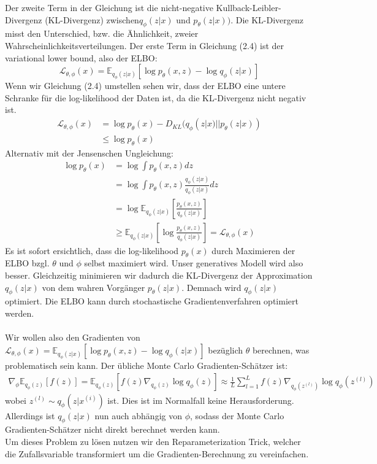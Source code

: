 \documentclass[%
thesis=student,%
coverpage=false,%
titlepage=false,%
headmarks=true, %
german,%
font=libertine, %
math=newpxtx, %
BCOR=5mm,%
coverBCOR=11mm%
]{tumbook}
\theoremstyle{break}
\begin{document}
Der zweite Term in der Gleichung ist die nicht-negative Kullback-Leibler-Divergenz (KL-Divergenz) zwischen$q_\phi(z|x)$ und $p_\theta(z|x))$. Die KL-Divergenz misst den Unterschied, bzw. die Ähnlichkeit, zweier Wahrscheinlichkeitsverteilungen.
Der erste Term in Gleichung (2.4) ist der variational lower bound, also der ELBO: 
$$\mathcal{L}_{\theta,\phi}(x) = \mathbb{E}_{q_\phi(z|x)}\left[\log p_\theta(x,z)- \log q_\phi(z|x)\right]$$
Wenn wir Gleichung (2.4) umstellen sehen wir, dass der ELBO eine untere Schranke für die log-likelihood der Daten ist, da die KL-Divergenz nicht negativ ist. 
\begin{align}
	\mathcal{L}_{\theta,\phi}(x) &= \log p_\theta(x) - D_{KL}(q_\phi(z|x)||p_\theta(z|x)) \\
	&\leq 	\log p_\theta(x) 
\end{align}\noindent
Alternativ mit der Jensenschen Ungleichung:
\begin{align}
	\log p_\theta(x) &= \log \int p_\theta(x,z) dz \\
	&= \log \int p_\theta(x,z) \frac{q_\phi(z|x)}{q_\phi(z|x)} dz \\
	& = \log \mathbb{E}_{q_\phi(z|x)}\left[\frac{p_\theta(x,z)}{q_\phi(z|x)}\right] \\
	& \geq \mathbb{E}_{q_\phi(z|x)}\left[\log \frac{p_\theta(x,z)}{q_\phi(z|x)}\right] = \mathcal{L}_{\theta,\phi}(x)
\end{align}\noindent
Es ist sofort ersichtlich, dass die log-likelihood $p_\theta(x)$ durch Maximieren der ELBO bzgl. $\theta$ und  $\phi$ selbst maximiert wird.
Unser generatives Modell wird also besser. Gleichzeitig minimieren wir dadurch die KL-Divergenz der Approximation $q_\phi(z|x)$ von dem wahren Vorgänger $p_\theta(z|x)$. Demnach wird $q_\phi(z|x)$ optimiert. 
Die ELBO kann durch stochastische Gradientenverfahren optimiert werden.\\
\\
Wir wollen also den Gradienten von $\mathcal{L}_{\theta,\phi}(x) = \mathbb{E}_{q_\phi(z|x)}\left[\log p_\theta(x,z)- \log q_\phi(z|x)\right]$ bezüglich $\theta$ berechnen, was problematisch sein kann. Der übliche Monte Carlo Gradienten-Schätzer ist: 
\begin{align}
 \nabla_\phi \mathbb{E}_{q_\phi(z)}[f(z)]= \mathbb{E}_{q_\phi(z)}[f(z)\nabla_{q_\phi(z)}\log q_\phi(z)] \approx \frac{1}{L} \sum_{l=1}^{L}f(z)\nabla_{q_\phi(z^{(l)})}\log q_\phi(z^{(l)})
\end{align}
wobei $z^{(l)} \sim q_\phi(z|x^{(i)})$ ist. 
Dies ist im Normalfall keine Herausforderung. Allerdings ist $q_\phi(z|x)$ nun auch abhängig von  $\phi$, sodass der Monte Carlo Gradienten-Schätzer nicht direkt berechnet werden kann. \\
Um dieses Problem zu lösen nutzen wir den Reparameterization Trick, welcher die Zufallsvariable transformiert um die Gradienten-Berechnung zu vereinfachen.  
\end{document}
